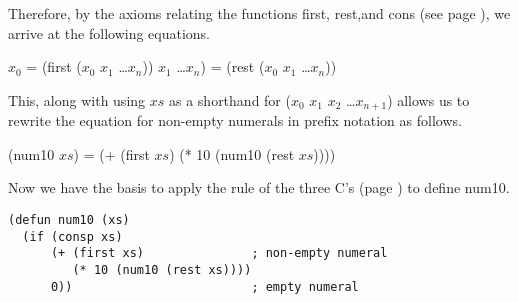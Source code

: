 Therefore, by the axioms relating the functions first, rest,and cons (see page \pageref{first-rest-cons}),
we arrive at the following equations.
\begin{center}
$x_0$ =  (first ($x_0$ $x_1$ \dots $x_{n}$))
$x_1$ \dots $x_{n}$) = (rest ($x_0$ $x_1$ \dots $x_{n}$))
\end{center}

This, along with using $xs$ as a shorthand for ($x_0$ $x_1$ $x_2$ \dots $x_{n+1}$)
allows us to rewrite the equation for non-empty numerals in prefix notation as follows.
\begin{center}
(num10 $xs$) = (+ (first $xs$) (* 10 (num10 (rest $xs$))))
\end{center}

Now we have the basis to apply the rule of the three C's 
(page \pageref{fig:inductive-def-keys}) to define num10.

\begin{lstlisting}
(defun num10 (xs)
  (if (consp xs)
      (+ (first xs)               ; non-empty numeral
         (* 10 (num10 (rest xs))))
      0))                         ; empty numeral
\end{lstlisting}




